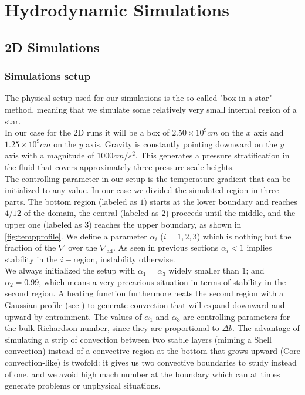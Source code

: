 
\chapter{Hydrodynamic Simulations}
\section{2D Simulations}
\subsection{Simulations setup}
The physical setup used for our simulations is the so called "box in a star" method, meaning that we simulate some relatively very small internal region of a star. \\
In our case for the 2D runs it will be a box of $2.50 \times 10^{9} cm$ on the $x$ axis and $1.25 \times 10^{9} cm$ on the $y$ axis. Gravity is constantly pointing downward on the $y$ axis with a magnitude of $1000 cm/s^2$. This generates a pressure stratification in the fluid that covers approximately three pressure scale heights. \\
The controlling parameter in our setup is the temperature gradient that can be initialized to any value. In our case we divided the simulated region in three parts. The bottom region (labeled as $1$) starts at the lower boundary and reaches $4/12$ of the domain, the central (labeled as $2$) proceeds until the middle, and the upper one (labeled as $3$) reaches the upper boundary, as shown in \ref{fig:tempprofile}. We define a parameter $\alpha_{i}$ ($i=1, 2, 3$) which is nothing but the fraction of the $\nabla$ over the $\nabla_{\mathrm{ad}}$. As seen in previous sections $\alpha_{i}<1$ implies stability in the $i-$region, instability otherwise. \\
We always initialized the setup with $\alpha_{1} = \alpha_{3}$ widely smaller than $1$; and $\alpha_{2}=0.99$, which means a very precarious situation in terms of stability in the second region. A heating function furthermore heats the second region with a Gaussian profile (see \label{fig:tempprofile}) to generate convection that will expand downward and upward by entrainment. The values of $\alpha_{1}$ and $\alpha_{3}$ are controlling parameters for the bulk-Richardson number, since they are proportional to $\Delta b$. The advantage of simulating a strip of convection between two stable layers (miming a Shell convection) instead of a convective region at the bottom that grows upward (Core convection-like) is twofold: it gives us two convective boundaries to study instead of one, and we avoid high mach number at the boundary which can at times generate problems or unphysical situations. \\
